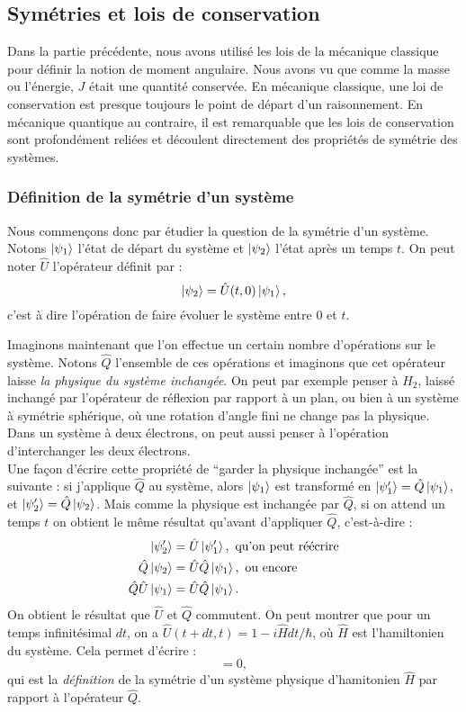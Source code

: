 \subsection{Symétries et lois de conservation}

Dans la partie précédente, nous avons utilisé les lois de la mécanique classique pour définir la notion de moment angulaire. Nous avons vu que comme la masse ou l'énergie, $J$ était une quantité conservée. En mécanique classique, une loi de conservation est presque toujours le point de départ d'un raisonnement. En mécanique quantique au contraire, il est remarquable que les lois de conservation sont profondément reliées et découlent directement des propriétés de symétrie des systèmes. 

\subsubsection{Définition de la symétrie d'un système}
Nous commençons donc par étudier la question de la symétrie d'un système. Notons $\ket{\psi_1}$ l'état de départ du système et $\ket{\psi_2}$ l'état après un temps $t$. On peut noter $\hat{U}$ l'opérateur définit par :
\begin{equation*}
\ket{\psi_2}=\hat{U}(t,0)\ket{\psi_1},
\end{equation*}
c'est à dire l'opération de faire évoluer le système entre 0 et $t$.

Imaginons maintenant que l'on effectue un certain nombre d'opérations sur le système. Notons $\hat{Q}$ l'ensemble de ces opérations et imaginons que cet opérateur laisse \textit{la physique du système inchangée}. On peut par exemple penser à $H_2$, laissé inchangé par l'opérateur de réflexion par rapport à un plan, ou bien à un système à symétrie sphérique, où une rotation d'angle fini ne change pas la physique. Dans un système à deux électrons, on peut aussi penser à l'opération d'interchanger les deux électrons. \\
Une façon d'écrire cette propriété de ``garder la physique inchangée'' est la suivante : si j'applique $\hat{Q}$ au système, alors $\ket{\psi_1}$ est transformé en $\ket{\psi'_1}=\hat{Q}\ket{\psi_1}$, et $\ket{\psi'_2}=\hat{Q}\ket{\psi_2}$. Mais comme la physique est inchangée par $\hat{Q}$, si on attend un temps $t$ on obtient le même résultat qu'avant d'appliquer $\hat{Q}$, c'est-à-dire :
\begin{align*}
\ket{\psi'_2}&=\hat{U}\ket{\psi'_1}, \mbox{ qu'on peut réécrire}\\
\hat{Q}\ket{\psi_2}&=\hat{U}\hat{Q}\ket{\psi_1}, \mbox{ ou encore}\\
\hat{Q}\hat{U}\ket{\psi_1}&=\hat{U}\hat{Q}\ket{\psi_1}.
\end{align*}
On obtient le résultat que $\hat{U}$ et $\hat{Q}$ commutent. On peut montrer que pour un temps infinitésimal $dt$, on a $\hat{U}(t+dt,t) = 1-i\hat{H}dt/\hbar$, où $\hat{H}$ est l'hamiltonien du système. Cela permet d'écrire :
\begin{equation*}
[\hat{H},\hat{Q}]=0,
\end{equation*}
qui est la \textit{définition} de la symétrie d'un système physique d'hamitonien $\hat{H}$ par rapport à l'opérateur $\hat{Q}$.

